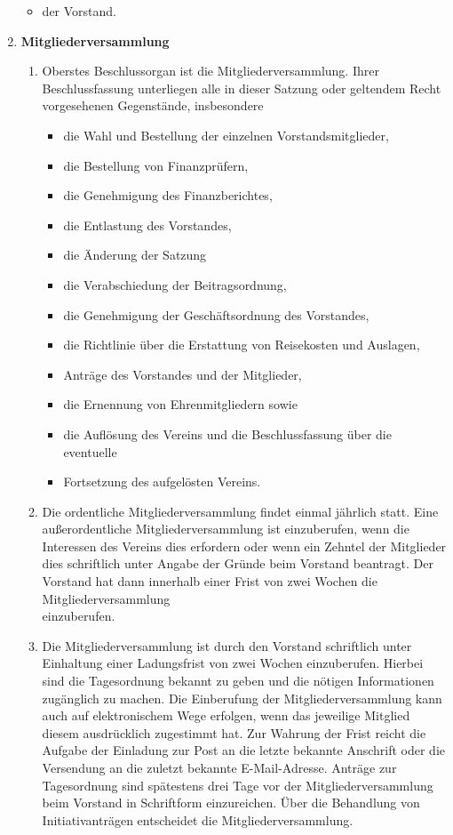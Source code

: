 \begin{enumerate}[label=\bfseries §\arabic*]
\begin{itemize}
      \item der Vorstand.
    \end{itemize}
  \item \textbf{Mitgliederversammlung}
    \begin{enumerate}[label=\bfseries (\arabic*)]
      \item Oberstes Beschlussorgan ist die Mitgliederversammlung. Ihrer Beschlussfassung unterliegen alle in dieser Satzung oder geltendem Recht vorgesehenen Gegenstände, insbesondere
        \begin{itemize}
          \item die Wahl und Bestellung der einzelnen Vorstandsmitglieder,
          \item die Bestellung von Finanzprüfern,
          \item die Genehmigung des Finanzberichtes,
          \item die Entlastung des Vorstandes,
          \item die Änderung der Satzung
          \item die Verabschiedung der Beitragsordnung,
          \item die Genehmigung der Geschäftsordnung des Vorstandes,
          \item die Richtlinie über die Erstattung von Reisekosten und Auslagen,
          \item Anträge des Vorstandes und der Mitglieder,
          \item die Ernennung von Ehrenmitgliedern sowie
          \item die Auflösung des Vereins und die Beschlussfassung über die eventuelle
          \item Fortsetzung des aufgelösten Vereins.
        \end{itemize}
      \item Die ordentliche Mitgliederversammlung findet einmal jährlich statt. Eine außerordentliche Mitgliederversammlung ist einzuberufen, wenn die Interessen des Vereins dies erfordern oder wenn ein Zehntel der Mitglieder dies schriftlich unter Angabe der Gründe beim Vorstand beantragt. Der Vorstand hat dann innerhalb einer Frist von zwei Wochen die Mitgliederversammlung\\ einzuberufen.
      \item Die Mitgliederversammlung ist durch den Vorstand schriftlich unter Einhaltung einer Ladungsfrist von zwei Wochen einzuberufen. Hierbei sind die Tagesordnung bekannt zu geben und die nötigen Informationen zugänglich zu machen. Die Einberufung der Mitgliederversammlung kann auch auf elektronischem Wege erfolgen, wenn das jeweilige Mitglied diesem ausdrücklich zugestimmt hat. Zur Wahrung der Frist reicht die Aufgabe der Einladung zur Post an die letzte bekannte Anschrift oder die Versendung an die zuletzt bekannte E-Mail-Adresse. Anträge zur Tagesordnung sind spätestens drei Tage vor der Mitgliederversammlung beim Vorstand in Schriftform einzureichen. Über die Behandlung von Initiativanträgen entscheidet die Mitgliederversammlung.

\end{enumerate}
\end{enumerate}

